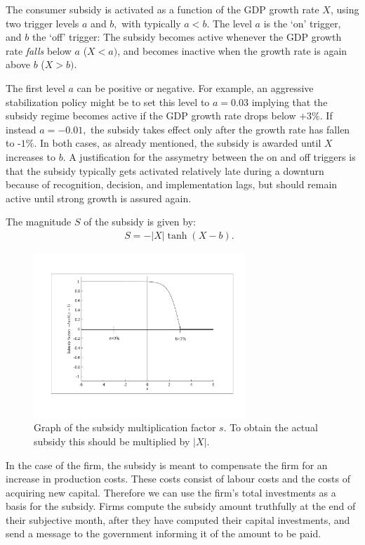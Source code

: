 \bigskip The consumer subsidy is activated as a function of the GDP growth
rate $X$, using two trigger levels $a$ and $b,$ with typically $a<b$. The
level $a$ is the `on' trigger, and $b$ the `off' trigger: 
The subsidy becomes active whenever the GDP growth rate \textit{falls} below $a$ ($%
X<a)$, and becomes inactive when the growth rate is again above $b$ ($X>b)$.

\bigskip The first level $a$ can be positive or negative. For example, an
aggressive stabilization policy might be to set this level to $a=0.03$
implying that the subsidy regime becomes active if the GDP growth rate drops
below $+3\%$. If instead $a=-0.01,$ the subsidy takes effect only after the
growth rate has fallen to -$1\%$. In both cases, as already mentioned, the
subsidy is awarded until $X$ increases to $b$. A justification for the
assymetry between the on and off triggers is that the subsidy typically gets
activated relatively late during a downturn because of recognition,
decision, and implementation lags, but should remain active until strong
growth is assured again.

\bigskip The magnitude $S$ of the subsidy is given by:
\begin{equation}
\begin{array}{l}
S=-|X|\tanh (X-b).\text{ }%
\end{array}%
\end{equation}

\begin{figure}[ht!]
\centering\leavevmode
\begin{boxedminipage}{14cm}
\centering\leavevmode
\includegraphics[width=8cm]{./stabilization/png/subsidy.png}
\end{boxedminipage}
\caption{Graph of the subsidy multiplication factor $s$. To obtain the
actual subsidy this should be multiplied by $|X|$.}
\label{Figure: subsidy multiplication factor}
\end{figure}

In the case of the firm, the subsidy is meant to compensate the firm for an
increase in production costs. These costs consist of labour costs and the
costs of acquiring new capital. Therefore we can use the firm's total
investments as a basis for the subsidy. Firms compute the subsidy amount
truthfully at the end of their subjective month, after they have computed
their capital investments, and send a message to the government informing it
of the amount to be paid.

% 